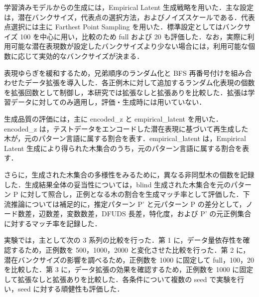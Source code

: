 \documentclass[submit,techrep,noauthor]{ipsj}
\begin{document}

学習済みモデルからの生成には，Empirical Latent 生成戦略を用いた．主な設定は，潜在バンクサイズ，代表点の選択方法，およびノイズスケールである．代表点選択には主に Farthest Point Sampling を用いた．標準設定としてはバンクサイズ 100 を中心に用い，比較のため full および 20 も評価した．なお，実際に利用可能な潜在表現数が設定したバンクサイズより少ない場合には，利用可能な個数に応じて実効的なバンクサイズが決まる．


表現ゆらぎを緩和するため，兄弟順序のランダム化と BFS 再番号付けを組み合わせたデータ拡張を導入した．各正例木に対して追加するランダム化表現の個数を拡張回数として制御し，本研究では拡張なしと拡張ありを比較した．拡張は学習データに対してのみ適用し，評価・生成時には用いていない．


生成品質の評価には，主に encoded\_z と empirical\_latent を用いた．encoded\_z は，テストデータをエンコードした潜在表現に基づいて再生成した木が，元のパターン言語に属する割合を表す．empirical\_latent は，Empirical Latent 生成により得られた木集合のうち，元のパターン言語に属する割合を表す．

さらに，生成された木集合の多様性をみるために，異なる非同型木の個数を記録した．生成結果全体の妥当性については，blind 生成された木集合を元のパターン P に対して照合し，正例となる木の割合を生成マッチ率として評価した．下流推論については補足的に，推定パターン P' と元パターン P の差分として，ノード数差，辺数差，変数数差，DFUDS 長差，特化度，および P' の元正例集合に対するマッチ率を記録した．


実験では，主として次の 3 系列の比較を行った．第 1 に，データ量依存性を確認するため，正例数を 500，1000，2000 と変化させた比較を行った．第 2 に，潜在バンクサイズの影響を調べるため，正例数を 1000 に固定して full，100，20 を比較した．第 3 に，データ拡張の効果を確認するため，正例数を 1000 に固定して拡張なしと拡張ありを比較した．各条件について複数の seed で実験を行い，seed に対する頑健性も評価した．
\end{document}

